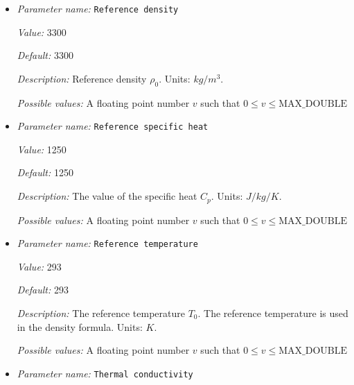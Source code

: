 \begin{itemize}
\item {\it Parameter name:} {\tt Reference density}
\label{parameters:Material model/Simpler model/Reference density}
\label{parameters:Material_20model/Simpler_20model/Reference_20density}


{\it Value:} 3300


{\it Default:} 3300


{\it Description:} Reference density $\rho_0$. Units: $kg/m^3$.


{\it Possible values:} A floating point number $v$ such that $0 \leq v \leq \text{MAX\_DOUBLE}$
\item {\it Parameter name:} {\tt Reference specific heat}
\label{parameters:Material model/Simpler model/Reference specific heat}
\label{parameters:Material_20model/Simpler_20model/Reference_20specific_20heat}


{\it Value:} 1250


{\it Default:} 1250


{\it Description:} The value of the specific heat $C_p$. Units: $J/kg/K$.


{\it Possible values:} A floating point number $v$ such that $0 \leq v \leq \text{MAX\_DOUBLE}$
\item {\it Parameter name:} {\tt Reference temperature}
\label{parameters:Material model/Simpler model/Reference temperature}
\label{parameters:Material_20model/Simpler_20model/Reference_20temperature}


{\it Value:} 293


{\it Default:} 293


{\it Description:} The reference temperature $T_0$. The reference temperature is used in the density formula. Units: $K$.


{\it Possible values:} A floating point number $v$ such that $0 \leq v \leq \text{MAX\_DOUBLE}$
\item {\it Parameter name:} {\tt Thermal conductivity}
\label{parameters:Material model/Simpler model/Thermal conductivity}
\label{parameters:Material_20model/Simpler_20model/Thermal_20conductivity}



\end{itemize}
